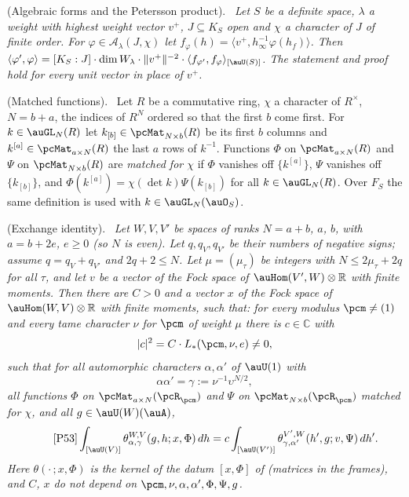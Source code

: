 \documentclass[10pt]{amsart}
\theoremstyle{definition}
\theoremstyle{remark}
\newcommand{\C}{\mathbb C}
\newcommand{\R}{\mathbb R}
\newenvironment{quotedthm}[2]{\par\medskip\noindent\begingroup
  \textbf{#1}#2.\ \itshape\ignorespaces}{\endgroup\par\medskip}
\newenvironment{quoteddef}[2]{\par\medskip\noindent\begingroup
  \textbf{#1}#2.\ \ignorespaces}{\endgroup\par\medskip}
\begin{document}
\begin{quotedthm}{\cite[Lemma~2.18]{P53}}{ (Algebraic forms and the Petersson product)}
Let $S$ be a definite space, $\lambda$ a weight with highest weight vector $v^+$, $J\subseteq K_S$
open and $\chi$ a character of $J$ of finite order. For $\varphi\in\mathcal A_\lambda(J,\chi)$ let
$f_\varphi(h)=\langle v^+,h_\infty^{-1}\varphi(h_f)\rangle$. Then
$\langle\varphi',\varphi\rangle=[K_S:J]\cdot\dim W_\lambda\cdot\|v^+\|^{-2}\cdot\langle f_{\varphi'},
f_\varphi\rangle_{[\auU(S)]}$. The statement and proof hold for every unit vector in place of $v^+$.
\end{quotedthm}

\begin{quoteddef}{\cite[Definition~3.1]{P53}}{ (Matched functions)}
Let $R$ be a commutative ring, $\chi$ a character of $R^\times$, $N=b+a$, the indices of $R^N$
ordered so that the first $b$ come first. For $k\in\auGL_N(R)$ let $k_{[b]}\in\pcMat_{N\times b}(R)$
be its first $b$ columns and $k^{[a]}\in\pcMat_{a\times N}(R)$ the last $a$ rows of $k^{-1}$.
Functions $\Phi$ on $\pcMat_{a\times N}(R)$ and $\Psi$ on $\pcMat_{N\times b}(R)$ are \emph{matched
for $\chi$} if $\Phi$ vanishes off $\{k^{[a]}\}$, $\Psi$ vanishes off $\{k_{[b]}\}$, and
$\Phi(k^{[a]})=\chi(\det k)\Psi(k_{[b]})$ for all $k\in\auGL_N(R)$. Over $F_S$ the same definition is
used with $k\in\auGL_N(\auO_S)$.
\end{quoteddef}

\begin{quotedthm}{\cite[Theorem~3.2]{P53}}{ (Exchange identity)}
Let $W,V,V'$ be spaces of ranks $N=a+b$, $a$, $b$, with $a=b+2e$, $e\ge0$ (so $N$ is even). Let
$q,q_V,q_{V'}$ be their numbers of negative signs; assume $q=q_V+q_{V'}$ and $2q+2\le N$. Let
$\mu=(\mu_\tau)$ be integers with $N\le2\mu_\tau+2q$ for all $\tau$, and let $v$ be a vector of the
Fock space of $\auHom(V',W)\otimes\R$ with finite moments. Then there are $C>0$ and a vector $x$ of
the Fock space of $\auHom(W,V)\otimes\R$ with finite moments, such that: for every modulus
$\pcm\ne(1)$ and every tame character $\nu$ for $\pcm$ of weight $\mu$ there is $c\in\C$ with
\[
|c|^2=C\cdot L_*(\pcm,\nu,e)\ne0,
\]
such that for all automorphic characters $\alpha,\alpha'$ of $\auU(1)$ with
\[
\alpha\alpha'=\gamma:=\nu^{-1}\upsilon^{N/2},
\]
all functions $\Phi$ on $\pcMat_{a\times N}(\pcR_\pcm)$ and $\Psi$ on $\pcMat_{N\times b}(\pcR_\pcm)$
matched for $\chi$, and all $g\in\auU(W)(\auA)$,
\begin{equation*}\tag*{{\cite[(12)]{P53}}}
\int_{[\auU(V)]}\theta^{W,V}_{\alpha,\gamma}(g,h;x,\Phi)\,dh=c\int_{[\auU(V')]}
\theta^{V',W}_{\gamma,\alpha'}(h',g;v,\Psi)\,dh' .
\end{equation*}
Here $\theta(\cdot\,;x,\Phi)$ is the kernel of the datum $[x,\Phi]$ of {\cite[\S2.3]{P53}} (matrices
in the frames), and $C$, $x$ do not depend on $\pcm,\nu,\alpha,\alpha',\Phi,\Psi,g$.
\end{quotedthm}
\end{document}
